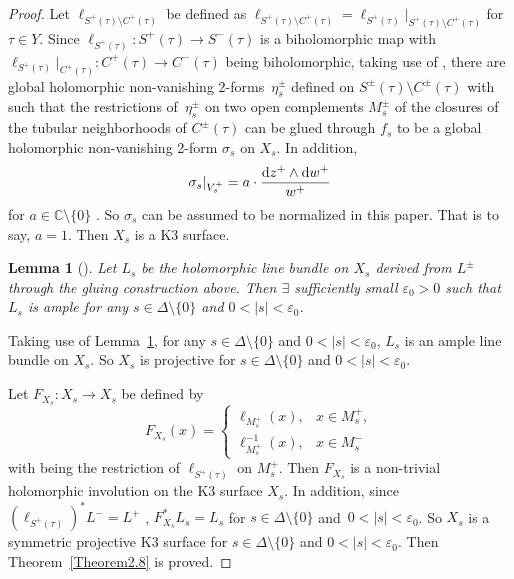 \documentclass[pdftex]{sigma}
\numberwithin{equation}{section}
\newtheorem{Lemma}[Theorem]{Lemma}
\begin{document}
\begin{proof}
Let $\ell_{S^+(\tau)\setminus C^+(\tau)}$ be defined as $\ell_{S^+(\tau)\setminus C^+(\tau)}=\ell_{S^+(\tau)}|_{S^+(\tau)\setminus C^+(\tau)}$ for $\tau \in Y$. Since $\ell_{S^+(\tau)}\colon S^+(\tau)\rightarrow S^-(\tau)$ is a biholomorphic map with $\ell_{S^+(\tau)}|_{C^{+}(\tau)}\colon C^+(\tau)\rightarrow C^-(\tau)$ being biholomorphic, taking use of \cite[Proposition~2.1]{Takayuki-Takato1}, there are global holomorphic non-vanishing 2-forms~$\eta^{\pm}_s$ defined on $S^{\pm}(\tau)\setminus C^{\pm}(\tau)$ with  such that the restrictions of~$\eta^{\pm}_s$ on two open complements $M^{\pm}_s$ of the closures of the tubular neighborhoods of $C^{\pm}(\tau)$ can be glued through $f_s$ to be a global holomorphic non-vanishing 2-form $\sigma_s$ on $X_s$. In addition,
\[\sigma_s|_{V^+_s}=a\cdot \frac{{\rm d}z^+ \wedge {\rm d}w^+}{w^+}\]
for $a \in \mathbb{C} \setminus \{ 0 \}$ . So $\sigma_s$ can be assumed to be normalized in this paper. That is to say, $a=1$. Then $X_s$ is a K3 surface.

\begin{Lemma}[{\cite[Theorem~1.2]{Takayuki-Takato2}}]\label{Lemma2.9} Let $L_s$ be the holomorphic line bundle on $X_s$ derived from $L^{\pm}$ through the gluing construction above. Then $\exists$ sufficiently small $\varepsilon_0 >0$ such that $L_s$ is ample for any $s \in \Delta \setminus \{ 0\} $ and $0<|s|<\varepsilon_0$.
\end{Lemma}

Taking use of Lemma~\ref{Lemma2.9}, for any $s \in \Delta \setminus \{ 0\} $ and $0<|s|<\varepsilon_0$, $L_s$ is an ample line bundle on $X_s$. So $X_s$ is projective for $s \in \Delta \setminus \{ 0\} $ and $0<|s|<\varepsilon_0$.

Let $F_{X_s}\colon X_s \rightarrow X_s$ be defined by
\[F_{X_s}(x)=\begin{cases}
\ell_{M^+_s}(x), &x \in M^{+}_s,\\
\ell^{-1}_{M^+_s}(x), &x \in M^{-}_s
\end{cases}\]
with  being the restriction of $\ell_{S^{+}(\tau)}$ on $M^{+}_s$. Then $F_{X_s}$ is a non-trivial holomorphic involution on the K3 surface $X_s$. In addition, since $(\ell_{S^{+}(\tau)})^*L^{-}=L^{+}$ , $F^{*}_{X_s}L_s=L_s$ for $s \in \Delta \setminus \{ 0\} $ and~${0<|s|<\varepsilon_0}$. So $X_s$ is a symmetric projective K3 surface for $s \in \Delta \setminus \{ 0\} $ and $0<|s|<\varepsilon_0$. Then Theorem~\ref{Theorem2.8} is proved.
\end{proof}
\end{document}

